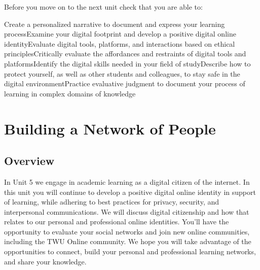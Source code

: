\documentclass[
  letterpaper,
  DIV=11,
  numbers=noendperiod]{scrreprt}
\begin{document}
\begin{tcolorbox}[enhanced jigsaw, toprule=.15mm, colback=white, colframe=quarto-callout-note-color-frame, bottomtitle=1mm, leftrule=.75mm, coltitle=black, titlerule=0mm, rightrule=.15mm, colbacktitle=quarto-callout-note-color!10!white, left=2mm, title={Checking Your Learning}, opacitybacktitle=0.6, opacityback=0, breakable, toptitle=1mm, arc=.35mm, bottomrule=.15mm]

Before you move on to the next unit check that you are able to:

Create a personalized narrative to document and express your learning
processExamine your digital footprint and develop a positive digital
online identityEvaluate digital tools, platforms, and interactions based
on ethical principlesCritically evaluate the affordances and restraints
of digital tools and platformsIdentify the digital skills needed in your
field of studyDescribe how to protect yourself, as well as other
students and colleagues, to stay safe in the digital environmentPractice
evaluative judgment to document your process of learning in complex
domains of knowledge

\end{tcolorbox}


\chapter{Building a Network of
People}\label{building-a-network-of-people}

\section*{Overview}\label{overview-4}


In Unit 5 we engage in academic learning as a digital citizen of the
internet. In this unit you will continue to develop a positive digital
online identity in support of learning, while adhering to best practices
for privacy, security, and interpersonal communications. We will discuss
digital citizenship and how that relates to our personal and
professional online identities. You'll have the opportunity to evaluate
your social networks and join new online communities, including the TWU
Online community. We hope you will take advantage of the opportunities
to connect, build your personal and professional learning networks, and
share your knowledge.
\end{document}
